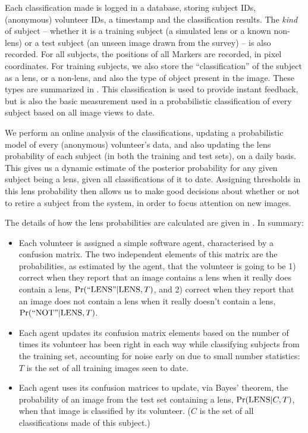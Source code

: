 \documentclass[useAMS,usenatbib,a4paper]{mn2e}
\begin{document}
Each classification made is logged in a database, storing subject IDs,
(anonymous) volunteer IDs, a timestamp and the classification results.  The
{\it kind} of subject -- whether it is a training subject (a  simulated lens
or a known non-lens) or a test subject (an unseen image drawn from the survey)
-- is also recorded. For all subjects, the positions of all Markers are
recorded, in pixel coordinates. For training subjects, we also store the
``classification'' of the subject as a lens, or a non-lens, and also the type
of object present in the image. These types are summarized in
.  This classification is used to provide instant
feedback, but is also the basic measurement used in a probabilistic
classification of every subject based on all image views to date.

We perform an online analysis of the classifications,  updating a
probabilistic model of every (anonymous) volunteer's data, and also updating
the lens probability of each subject  (in both the training and test sets), on
a daily basis. This gives us a dynamic estimate of the posterior probability
for  any given  subject being a lens, given all classifications of it to date.
Assigning thresholds in this lens probability then allows us to make good
decisions about whether or not to retire a subject from the system, in order to
focus attention on new images. 

The details of how the lens probabilities are calculated are given in
. In summary:
\begin{itemize}

\item Each volunteer is assigned a simple software agent, characterised by a
confusion matrix. The two independent elements of this matrix are the
probabilities, as estimated by the agent, that the volunteer is going to be 1)
correct when they report that an image contains a lens when it really does
contain a lens, ${\rm Pr}({\rm ``LENS"}|{\rm LENS},T)$, and 2) correct when they report that
an image does not contain a lens when it really doesn't contain a lens,
${\rm Pr}({\rm ``NOT"}|{\rm LENS},T)$.

\item Each agent updates its confusion matrix elements based on the number of
times its volunteer has been right in each way while classifying subjects from
the training set, accounting for noise early on due to small number
statistics: $T$ is the set of all training images seen to date.

\item Each agent uses its confusion matrices to update, via Bayes' theorem,
the probability of an image from the test set containing a lens,
${\rm Pr}({\rm LENS}|C,T)$, when that image is classified by its volunteer. ($C$ is the
set of all classifications made of this subject.)

\end{itemize}
\end{document}
